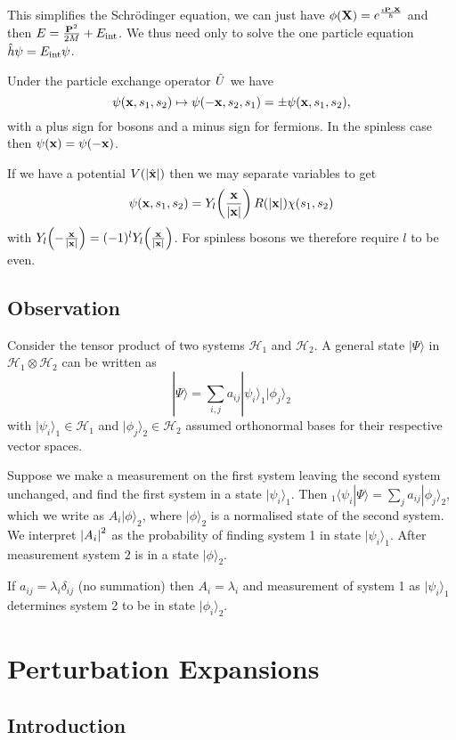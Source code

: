 \documentclass{notes}
\newcommand{\cH}{\mathcal{H}}
\newcommand{\ket}[1]{|#1\rangle}
\newcommand{\scp}[2]{\langle#1|#2\rangle}
\begin{document}
This simplifies the Schr\"odinger equation, we can just have ${\phi(\mathbf{X})
= e^{\frac{\imath \mathbf{P}.\mathbf{X}}{\hbar}}}$ and then
$E = \frac{\mathbf{P}^2}{2 M} + E_{\text{int}}$.  We thus need only to solve
the one particle equation $\Hat{h} \psi = E_{\text{int}} \psi$.

Under the particle exchange operator $\Hat{U}$ we have
\[
\psi(\mathbf{x},s_1,s_2) \mapsto \psi(-\mathbf{x},s_2,s_1)
= \pm \psi(\mathbf{x},s_1,s_2),
\]
with a plus sign for bosons and a minus sign for fermions.  In the
spinless case then $\psi(\mathbf{x}) = \psi(-\mathbf{x})$.

If we have a potential $V(\left|\Hat{\mathbf{x}}\right|)$ then we may separate
variables to get
\[
\psi(\mathbf{x},s_1,s_2) = Y_l\!\left( \frac{\mathbf{x}}{\left|\mathbf{x}\right|}\right)
R(\left|\mathbf{x}\right|) \chi(s_1,s_2)
\]
with $Y_l\!\left(- \frac{\mathbf{x}}{\left|\mathbf{x}\right|} \right) = (-1)^l
Y_l\!\left( \frac{\mathbf{x}}{\left|\mathbf{x}\right|} \right)$.  For spinless bosons
we therefore require $l$ to be even.

\section{Observation}

Consider the tensor product of two systems $\cH_1$ and $\cH_2$.  A general
state $\ket{\Psi}$ in $\cH_1 \otimes \cH_2$ can be written as
\[
\ket{\Psi} = \sum_{i,j} a_{i j} \ket{\psi_i}_1 \ket{\phi_j}_2
\]
with $\ket{\psi_i}_1 \in \cH_1$ and $\ket{\phi_j}_2 \in \cH_2$ assumed
orthonormal bases for their respective vector spaces.

Suppose we make a measurement on the first system leaving the second system
unchanged, and find the first system in a state $\ket{\psi_i}_1$.
Then ${}_1\!\scp{\psi_i}{\Psi} = \sum_j a_{i j} \ket{\phi_j}_2$,
which we write as $A_i \ket{\phi}_2$, where $\ket{\phi}_2$ is a normalised
state of the second system.  We interpret $\left|A_i\right|^2$ as the probability
of finding system 1 in state $\ket{\psi_i}_1$.  After measurement system
$2$ is in a state $\ket{\phi}_2$.

If $a_{i j} = \lambda_i \delta_{i j}$ (no summation) then $A_i = \lambda_i$
and measurement of system 1 as $\ket{\psi_i}_1$ determines system 2 to be
in state $\ket{\phi_i}_2$.

\chapter{Perturbation Expansions}

\section{Introduction}
\end{document}
